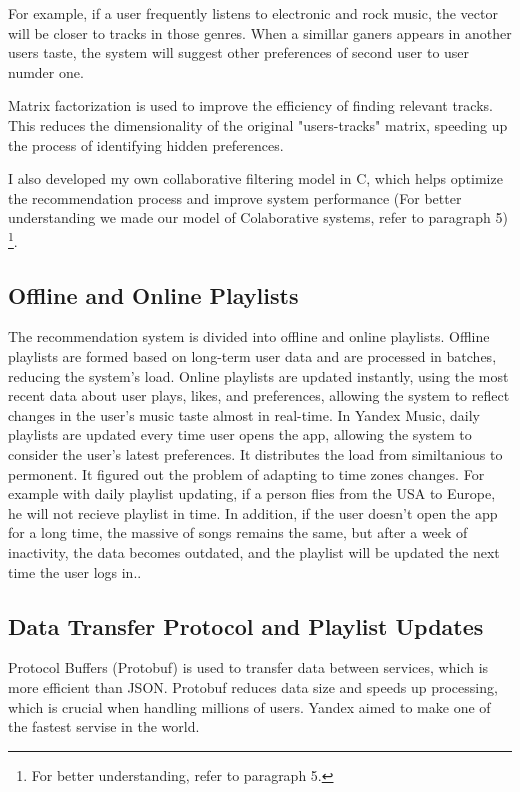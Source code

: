 \documentclass[12pt,a4paper]{article}
\begin{document}
For example, if a user frequently listens to electronic and rock music, the vector will be closer to tracks in those genres. When a simillar ganers appears in another users taste, the system will suggest other preferences of second user to user numder one.

Matrix factorization is used to improve the efficiency of finding relevant tracks. This reduces the dimensionality of the original "users-tracks" matrix, speeding up the process of identifying hidden preferences.

I also developed my own collaborative filtering model in C, which helps optimize the recommendation process and improve system performance (For better understanding we made our model of Colaborative systems, refer to paragraph 5) \footnote{For better understanding, refer to paragraph 5.}.

\subsection{Offline and Online Playlists}

The recommendation system is divided into offline and online playlists. Offline playlists are formed based on long-term user data and are processed in batches, reducing the system’s load. Online playlists are updated instantly, using the most recent data about user plays, likes, and preferences, allowing the system to reflect changes in the user's music taste almost in real-time.
In Yandex Music, daily playlists are updated every time user opens the app, allowing the system to consider the user’s latest preferences. It distributes the load from similtanious to permonent. It figured out the problem of adapting to time zones changes. For example with daily playlist updating, if a person flies from the USA to Europe, he will not recieve playlist in time. In addition, if the user doesn't open the app for a long time, the massive of songs remains the same, but after a week of inactivity, the data becomes outdated, and the playlist will be updated the next time the user logs in.\citep{lel}\citep{lol}.

\subsection{Data Transfer Protocol and Playlist Updates}

Protocol Buffers (Protobuf) is used to transfer data between services, which is more efficient than JSON. Protobuf reduces data size and speeds up processing, which is crucial when handling millions of users. Yandex aimed to make one of the fastest servise in the world.
\end{document}
